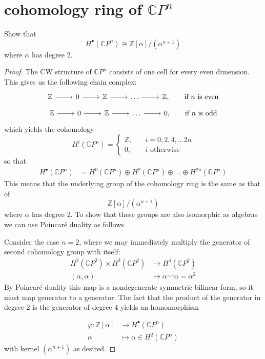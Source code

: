 \documentclass{article}
\numberwithin{equation}{section}
\newcommand{\Z}{\mathbb{Z}}
\newcommand{\C}{\mathbb{C}}
\begin{document}
\section{cohomology ring of $\C P^n$}
	\begin{exercise}
	Show that
	\[H^\bullet(\C P^n)\cong \Z[\alpha]/(\alpha^{n+1})\]
	where $\alpha$ has degree 2.
\end{exercise}
\begin{proof}
	The CW structure of $\C P^n$ consists of one cell for every even dimension. This gives us the following chain complex:
	\[\begin{tikzcd}
		\Z\arrow[r]&0\arrow[r]&\Z\arrow[r]&\ldots\arrow[r]&\Z,\qquad\text{if }n\text{ is even}
	\end{tikzcd}\]
	\[\begin{tikzcd}
		\Z\arrow[r]&0\arrow[r]&\Z\arrow[r]&\ldots\arrow[r]&0,\qquad\text{if }n\text{ is odd}
	\end{tikzcd}\]
	which yields the cohomology
	\[H^i(\C P^n)=\begin{cases}
		\Z,\quad&i=0,2,4,\ldots 2n\\
		0,\quad&i\text{ otherwise}
	\end{cases}\]
	so that
	\begin{align*}
		H^\bullet(\C P^n)&=H^0(\C P^n)\oplus H^2(\C P^n)\oplus\ldots\oplus H^{2n}(\C P^{n})
	\end{align*}
	This means that the underlying group of the cohomology ring is the same as that of
	\[\Z[\alpha]/(\alpha^{n+1})\]
	where $\alpha$ has degree 2. To show that these groups are also isomorphic as algebras we can use Poincar\'e duality as follows.
	
	Consider the case $n=2$, where we may immediately multiply the generator of second cohomology group with itself:
	\begin{align*}
		H^2(\C P^2)\times H^2(\C P^2)&\to H^4(\C P^2)\\
		(\alpha,\alpha)\qquad\quad&\mapsto\alpha\smile\alpha =\alpha^2
	\end{align*}
	By Poincar\'e duality this map is a nondegenerate symmetric bilinear form, so it must map generator to a generator. {\color{blue-violet}The fact that the product of the generator in degree 2 is the generator of degree 4} yields an homomorphism
	\iffalse\begin{align*}
		\varphi:H^\bullet(\C P^n)&\to\Z[\alpha]/(\alpha^{n+1})\\
		H^2(\C P^n)\ni\alpha&\mapsto\alpha
	\end{align*}
	satisfying
	\[\varphi(\alpha\smile\alpha)=\varphi()\]\fi
	\begin{align*}
		\varphi:\Z[\alpha]&\to H^\bullet(\C P^n)\\
		\alpha&\mapsto\alpha\in H^2(\C P^n)
	\end{align*}
	with kernel $(\alpha^{n+1})$ as desired.
	

\end{proof}
\end{document}
